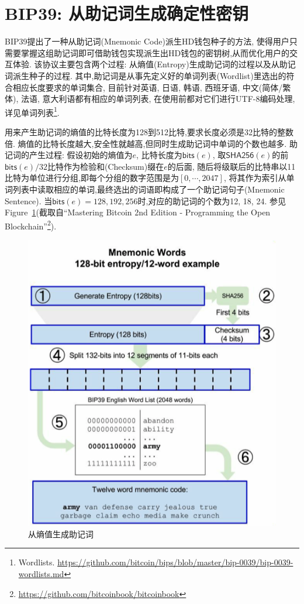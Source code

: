 \section{BIP39: 从助记词生成确定性密钥}

BIP39提出了一种从助记词(Mnemonic Code)派生HD钱包种子的方法,
使得用户只需要掌握这组助记词即可借助钱包实现派生出HD钱包的密钥树,从而优化用户的交互体验.  
该协议主要包含两个过程: 从熵值(Entropy)生成助记词的过程以及从助记词派生种子的过程.
其中,助记词是从事先定义好的单词列表(Wordlist)里选出的符合相应长度要求的单词集合,
目前针对英语, 日语, 韩语, 西班牙语, 中文(简体/繁体), 法语, 意大利语都有相应的单词列表,
在使用前都对它们进行UTF-8编码处理,详见单词列表\footnote{
Wordlists. \url{https://github.com/bitcoin/bips/blob/master/bip-0039/bip-0039-wordlists.md}}.

用来产生助记词的熵值的比特长度为128到512比特,要求长度必须是32比特的整数倍.
熵值的比特长度越大,安全性就越高,但同时生成助记词中单词的个数也越多.
助记词的产生过程: 假设初始的熵值为$e$, 比特长度为$\textsf{bits}(e)$,
取$\textsf{SHA256}(e)$的前$\textsf{bits}(e)/32$比特作为检验和(Checksum)缀在$e$的后面,
随后将级联后的比特串以11比特为单位进行分组,即每个分组的数字范围是为$[0,\cdots,2047]$,
将其作为索引从单词列表中读取相应的单词,最终选出的词语即构成了一个助记词句子(Mnemonic Sentence).
当$\textsf{bits}(e)=128,192,256$时,对应的助记词的个数为12, 18, 24.
参见Figure~\ref{fig-entropy2mnemonic}(截取自``Mastering Bitcoin 2nd Edition - 
Programming the Open Blockchain''\footnote{
\url{https://github.com/bitcoinbook/bitcoinbook}}).

\begin{figure}[h]
\centering
\includegraphics[width=.5\textwidth]{./entropy2mnemonic.png}
\caption{从熵值生成助记词}\label{fig-entropy2mnemonic}
\end{figure}

